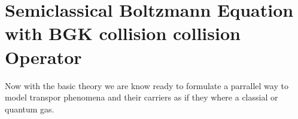 %

\chapter{Semiclassical Boltzmann Equation with BGK collision collision Operator}

Now with the basic theory we are know ready to formulate a parrallel way to model transpor phenomena and their carriers as if they where a classial or quantum gas.


%
